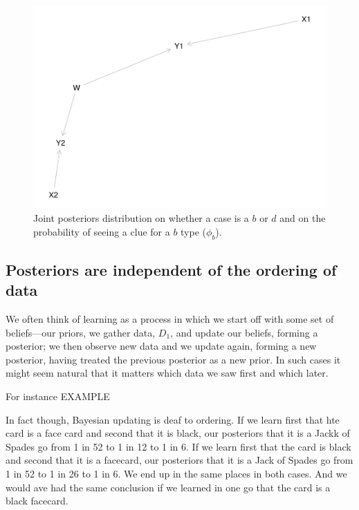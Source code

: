 \documentclass[12pt,]{book}
\begin{document}
\begin{figure}
\centering
\includegraphics{ii_files/figure-latex/unnamed-chunk-24-1.pdf}
\caption{\label{fig:unnamed-chunk-24}\label{fig:correlation} Joint posteriors distribution on whether a case is a \(b\) or \(d\) and on the probability of seeing a clue for a \(b\) type (\(\phi_b\)).}
\end{figure}

\hypertarget{posteriors-are-independent-of-the-ordering-of-data}{%
\subsection{Posteriors are independent of the ordering of data}\label{posteriors-are-independent-of-the-ordering-of-data}}

We often think of learning as a process in which we start off with some set of beliefs---our priors, we gather data, \(D_1\), and update our beliefs, forming a posterior; we then observe new data and we update again, forming a new posterior, having treated the previous posterior as a new prior. In such cases it might seem natural that it matters which data we saw first and which later.

For instance EXAMPLE

In fact though, Bayesian updating is deaf to ordering. If we learn first that hte card is a face card and second that it is black, our posteriors that it is a Jackk of Spades go from 1 in 52 to 1 in 12 to 1 in 6. If we learn first that the card is black and second that it is a facecard, our posteriors that it is a Jack of Spades go from 1 in 52 to 1 in 26 to 1 in 6. We end up in the same places in both cases. And we would ave had the same conclusion if we learned in one go that the card is a black facecard.
\end{document}
